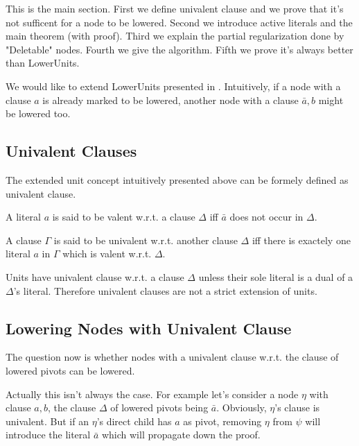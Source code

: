\documentclass{llncs}
\newenvironment{jogo}{\color{teal}}{}
\begin{document}
\begin{jogo}
This is the main section. First we define univalent clause and we prove that it's not sufficent for a node to be lowered. Second we introduce active literals and the main theorem (with proof). Third we explain the partial regularization done by "Deletable" nodes. Fourth we give the algorithm. Fifth we prove it's always better than LowerUnits.
\end{jogo}

We would like to extend LowerUnits presented in \cite{LURPI}. Intuitively,
if a node with a clause $a$ is already marked to be lowered, another node with
a clause $\bar{a},b$ might be lowered too.

\subsection{Univalent Clauses}

The extended unit concept intuitively presented above can be formely defined as
univalent clause.

\begin{definition}
A literal $a$ is said to be valent w.r.t. a clause $\Delta$ iff $\bar{a}$ does
not occur in $\Delta$.
\end{definition}

\begin{definition}
A clause $\Gamma$ is said to be univalent w.r.t. another clause $\Delta$ iff
there is exactely one literal $a$ in $\Gamma$ which is valent w.r.t. $\Delta$.
\end{definition}

Units have univalent clause w.r.t. a clause $\Delta$ unless their sole literal
is a dual of a $\Delta$'s literal. Therefore univalent clauses are not a
strict extension of units.


\subsection{Lowering Nodes with Univalent Clause}

The question now is whether nodes with a univalent clause w.r.t. the clause of
lowered pivots can be lowered.

Actually this isn't always the case. For example let's consider a node
$\eta$ with clause $a,b$, the clause $\Delta$ of lowered pivots being
$\bar{a}$. Obviously, $\eta$'s clause is univalent. But if an $\eta$'s
direct child has $a$ as pivot, removing $\eta$ from $\psi$ will introduce
the literal $\bar{a}$ which will propagate down the proof.
\end{document}
